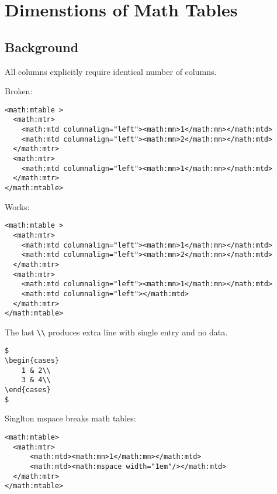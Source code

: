 \documentclass{article}
\begin{document}
\section{Dimenstions of Math Tables}

\subsection{Background}





All columns explicitly require identical number of columns.

Broken: 

\begin{verbatim}
<math:mtable > 
  <math:mtr> 
    <math:mtd columnalign="left"><math:mn>1</math:mn></math:mtd> 
    <math:mtd columnalign="left"><math:mn>2</math:mn></math:mtd> 
  </math:mtr> 
  <math:mtr> 
    <math:mtd columnalign="left"><math:mn>1</math:mn></math:mtd> 
  </math:mtr> 
</math:mtable> 
\end{verbatim}

Works:

\begin{verbatim}
<math:mtable > 
  <math:mtr> 
    <math:mtd columnalign="left"><math:mn>1</math:mn></math:mtd> 
    <math:mtd columnalign="left"><math:mn>2</math:mn></math:mtd> 
  </math:mtr> 
  <math:mtr> 
    <math:mtd columnalign="left"><math:mn>1</math:mn></math:mtd> 
    <math:mtd columnalign="left"></math:mtd> 
  </math:mtr> 
</math:mtable> 
\end{verbatim}


The last \verb+\\+ produces extra line with single entry and no data.

\begin{verbatim}
$ 
\begin{cases}  
    1 & 2\\ 
    3 & 4\\ 
\end{cases} 
$ 
\end{verbatim}

Singlton mspace breaks math tables:

\begin{verbatim}
<math:mtable> 
  <math:mtr> 
      <math:mtd><math:mn>1</math:mn></math:mtd> 
      <math:mtd><math:mspace width="1em"/></math:mtd> 
  </math:mtr> 
</math:mtable> 
\end{verbatim}
\end{document}
